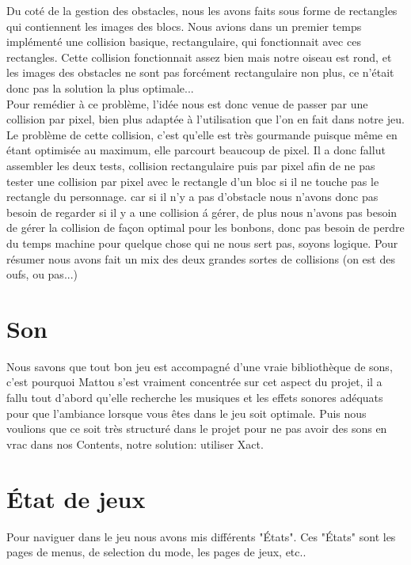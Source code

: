 \documentclass [11pt]{report}
\begin{document}
				
		\indent Du coté de la gestion des obstacles, nous les avons faits sous forme de rectangles qui contiennent les images des blocs. Nous avions dans un premier temps implémenté une collision basique, rectangulaire, qui fonctionnait avec ces rectangles. Cette collision fonctionnait assez bien mais notre oiseau est rond, et les images des obstacles ne sont pas forcément rectangulaire non plus, ce n'était donc pas la solution la plus optimale... \\
		\indent Pour remédier à ce problème, l'idée nous est donc venue de passer par une collision par pixel, bien plus adaptée à l'utilisation que l'on en fait dans notre jeu. Le problème de cette collision, c'est qu'elle est très gourmande puisque même en étant optimisée au maximum, elle parcourt beaucoup de pixel. Il a donc fallut assembler les deux tests, collision rectangulaire puis par pixel afin de ne pas tester une collision par pixel avec le rectangle d'un bloc si il ne touche pas le rectangle du personnage. car si il n'y a pas d'obstacle nous n'avons donc pas besoin de regarder si il y a une collision \'a g\'erer, de plus nous n'avons pas besoin de g\'erer la collision de façon optimal pour les bonbons, donc pas besoin de perdre du temps machine pour quelque chose qui ne nous sert pas, soyons logique. Pour résumer nous avons fait un mix des deux grandes sortes de collisions (on est des oufs, ou pas...)
	
	\newpage
	
	
	\section{Son}
		Nous savons que tout bon jeu est accompagné d'une vraie bibliothèque de sons, c'est pourquoi Mattou s'est vraiment concentrée sur cet aspect du projet, il a fallu tout d'abord qu'elle recherche les musiques et les effets sonores adéquats pour que l'ambiance lorsque vous êtes dans le jeu soit optimale. Puis nous voulions que ce soit très structuré dans le projet pour ne pas avoir des sons en vrac dans nos Contents, notre solution: utiliser Xact. 
		
		
		\vspace{10mm}
		
		
		\section{\'Etat de jeux}
		Pour naviguer dans le jeu nous avons mis différents "États". Ces "États" sont les pages de menus, de selection du mode, les pages de jeux, etc.. 
		
\end{document}
